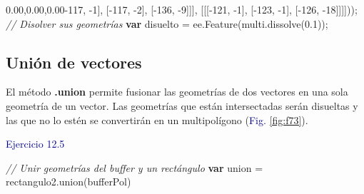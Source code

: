 \documentclass[
  12pt,
  letterpaper,
  twoside]{book}
\newenvironment{Shaded}{\begin{snugshade}}{\end{snugshade}}
\newcommand{\CommentTok}[1]{\textcolor[rgb]{0.24,0.58,0.00}{\textit{#1}}}
\newcommand{\DecValTok}[1]{\textcolor[rgb]{0.28,0.53,0.93}{#1}}
\newcommand{\FloatTok}[1]{\textcolor[rgb]{0.28,0.53,0.93}{#1}}
\newcommand{\FunctionTok}[1]{\textcolor[rgb]{0.48,0.12,0.64}{#1}}
\newcommand{\KeywordTok}[1]{\textcolor[rgb]{0.00,0.00,0.00}{\textbf{#1}}}
\newcommand{\NormalTok}[1]{#1}
\newcommand{\OperatorTok}[1]{\textcolor[rgb]{0.00,0.00,0.00}{#1}}
\newcommand\boldpurple[1]{\textcolor{darkpurple}{\textbf{#1}}}
\begin{document}
\begin{Shaded}
\begin{Highlighting}[]
\NormalTok{             [[[}\OperatorTok{{-}}\DecValTok{117}\OperatorTok{,} \OperatorTok{{-}}\DecValTok{1}\NormalTok{]}\OperatorTok{,}
\NormalTok{               [}\OperatorTok{{-}}\DecValTok{117}\OperatorTok{,} \OperatorTok{{-}}\DecValTok{2}\NormalTok{]}\OperatorTok{,}
\NormalTok{               [}\OperatorTok{{-}}\DecValTok{136}\OperatorTok{,} \OperatorTok{{-}}\DecValTok{9}\NormalTok{]]]}\OperatorTok{,}
\NormalTok{             [[[}\OperatorTok{{-}}\DecValTok{121}\OperatorTok{,} \OperatorTok{{-}}\DecValTok{1}\NormalTok{]}\OperatorTok{,}
\NormalTok{               [}\OperatorTok{{-}}\DecValTok{123}\OperatorTok{,} \OperatorTok{{-}}\DecValTok{1}\NormalTok{]}\OperatorTok{,}
\NormalTok{               [}\OperatorTok{{-}}\DecValTok{126}\OperatorTok{,} \OperatorTok{{-}}\DecValTok{18}\NormalTok{]]]]))}\OperatorTok{;}
\CommentTok{// Disolver sus geometrías}
\KeywordTok{var}\NormalTok{ disuelto }\OperatorTok{=}\NormalTok{ ee}\OperatorTok{.}\FunctionTok{Feature}\NormalTok{(multi}\OperatorTok{.}\FunctionTok{dissolve}\NormalTok{(}\FloatTok{0.1}\NormalTok{))}\OperatorTok{;}
\end{Highlighting}
\end{Shaded}

\hypertarget{uniuxf3n-de-vectores}{%
\subsection*{Unión de vectores}\label{uniuxf3n-de-vectores}}

El método \boldpurple{.union} permite fusionar las geometrías de dos vectores en una sola geometría de un vector. Las geometrías que están intersectadas serán disueltas y las que no lo estén se convertirán en un multipolígono (\textcolor{darkblue}{Fig.} \ref{fig:f73}).

\textcolor{darkblue}{Ejercicio 12.5}

\begin{Shaded}
\begin{Highlighting}[]
\CommentTok{// Unir geometrías del buffer y un rectángulo }
\KeywordTok{var}\NormalTok{ union }\OperatorTok{=}\NormalTok{ rectangulo2}\OperatorTok{.}\FunctionTok{union}\NormalTok{(bufferPol)}
\end{Highlighting}
\end{Shaded}
\end{document}

